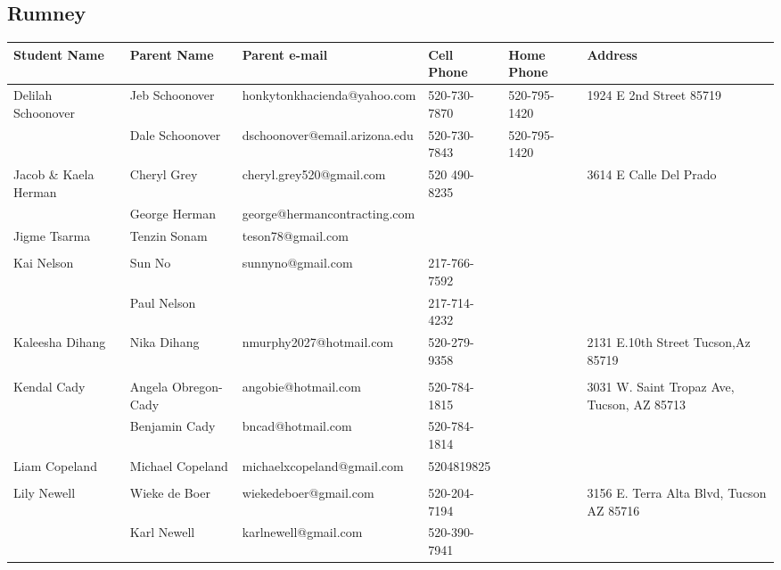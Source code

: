 \documentclass[landscape]{article}\usepackage[]{graphicx}\usepackage[]{color}
\begin{document}
\subsection{Rumney}
\begin{longtable}{|p{100pt}|p{100pt}|p{140pt}|p{60pt}|p{64pt}|p{120pt}|}
\textbf{Student Name} & \textbf{Parent Name} & \textbf{Parent e-mail} & \textbf{Cell Phone} & \textbf{Home Phone} & \textbf{Address}\\
\hline
\hline
\multirow{2}{100pt}{Delilah Schoonover} & Jeb Schoonover & honkytonkhacienda@yahoo.com & 520-730-7870 & 520-795-1420 & \multirow{2}{120pt}{1924 E 2nd Street 85719} \\
 & Dale Schoonover & dschoonover@email.arizona.edu & 520-730-7843 & 520-795-1420 & \\
\hline
\multirow{2}{100pt}{Jacob \& Kaela Herman} & Cheryl Grey & cheryl.grey520@gmail.com & 520 490-8235 &  & \multirow{2}{120pt}{3614 E Calle Del Prado} \\
 & George Herman & george@hermancontracting.com &  &  & \\
\hline
\multirow{2}{100pt}{Jigme Tsarma} & Tenzin Sonam & teson78@gmail.com &  &  & \multirow{2}{120pt}{} \\
 &  &  &  &  & \\
\hline
\multirow{2}{100pt}{Kai Nelson} & Sun No & sunnyno@gmail.com & 217-766-7592 &  & \multirow{2}{120pt}{} \\
 & Paul Nelson &  & 217-714-4232 &  & \\
\hline
\multirow{2}{100pt}{Kaleesha Dihang} & Nika Dihang & nmurphy2027@hotmail.com & 520-279-9358 &  & \multirow{2}{120pt}{2131 E.10th Street Tucson,Az 85719} \\
 &  &  &  &  & \\
\hline
\multirow{2}{100pt}{Kendal Cady} & Angela Obregon-Cady & angobie@hotmail.com & 520-784-1815 &  & \multirow{2}{120pt}{3031 W. Saint Tropaz Ave, Tucson, AZ 85713} \\
 & Benjamin Cady & bncad@hotmail.com & 520-784-1814 &  & \\
\hline
\multirow{2}{100pt}{Liam Copeland} & Michael Copeland & michaelxcopeland@gmail.com & 5204819825 &  & \multirow{2}{120pt}{} \\
 &  &  &  &  & \\
\hline
\multirow{2}{100pt}{Lily Newell} & Wieke de Boer & wiekedeboer@gmail.com & 520-204-7194 &  & \multirow{2}{120pt}{3156 E. Terra Alta Blvd, Tucson AZ 85716} \\
 & Karl Newell & karlnewell@gmail.com & 520-390-7941 &  & \\

\end{longtable}
\end{document}
